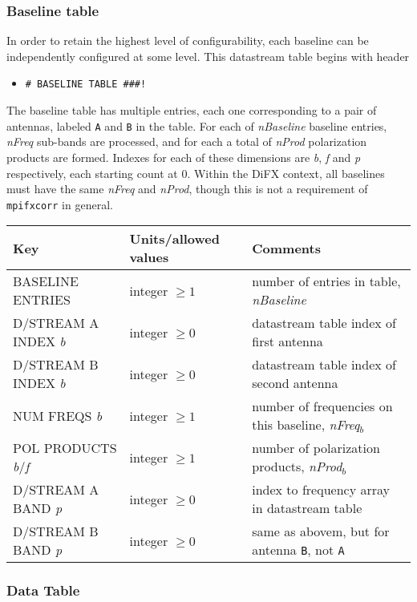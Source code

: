 \subsubsection{Baseline table}

In order to retain the highest level of configurability, each baseline can be independently configured at some level.
This datastream table begins with header 
\begin{itemize}
\item[] {\tt \verb+# BASELINE TABLE ###!+}
\end{itemize}
The baseline table has multiple entries, each one corresponding to a pair of antennas, labeled {\tt A} and {\tt B} in the table.
For each of {\em nBaseline} baseline entries, {\em nFreq} sub-bands are processed, and for each a total of {\em nProd} polarization products are formed.
Indexes for each of these dimensions are {\em b}, {\em f} and {\em p} respectively, each starting count at 0.
Within the DiFX context, all baselines must have the same {\em nFreq} and {\em nProd}, though this is not a requirement of {\tt mpifxcorr} in general.

\begin{center}
\begin{tabular}{l l l}
\hline
Key & Units/allowed values & Comments \\
\hline
BASELINE ENTRIES & integer $\ge 1$ & number of entries in table, {\em nBaseline} \\
\hline
D/STREAM A INDEX {\em b} & integer $\ge 0$ & datastream table index of first antenna \\
D/STREAM B INDEX {\em b} & integer $\ge 0$ & datastream table index of second antenna \\
NUM FREQS {\em b} & integer $\ge 1$ & number of frequencies on this baseline, {\em nFreq$_\mathit{b}$} \\
POL PRODUCTS {\em b}/{\em f} & integer $\ge 1$ & number of polarization products, {\em nProd$_\mathit{b}$} \\
D/STREAM A BAND {\em p} & integer $\ge 0$ & index to frequency array in datastream table \\
D/STREAM B BAND {\em p} & integer $\ge 0$ & same as abovem, but for antenna {\tt B}, not {\tt A} \\
\hline
\end{tabular}
\end{center}

\subsubsection{Data Table}

